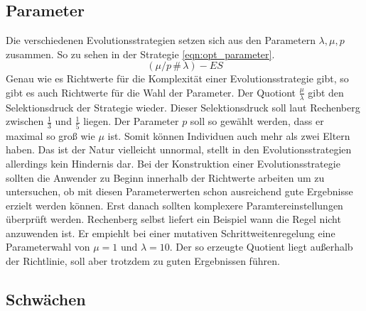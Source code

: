 \subsection{Parameter}
Die verschiedenen Evolutionsstrategien setzen sich aus den Parametern $\lambda, \mu, p$ zusammen. So zu sehen in der Strategie \ref{eqn:opt_parameter}.
\begin{equation}
\label{eqn:opt_parameter}
(\mu/p\,\#\,\lambda)-ES
\end{equation}
Genau wie es Richtwerte für die Komplexität einer Evolutionsstrategie gibt, so gibt es auch Richtwerte für die Wahl der Parameter.
Der Quotiont $\frac{\mu}{\lambda}$ gibt den Selektionsdruck der Strategie wieder. Dieser Selektionsdruck soll laut Rechenberg zwischen $\frac{1}{3}$ und $\frac{1}{5}$ liegen.
Der Parameter $p$ soll so gewählt werden, dass er maximal so groß wie $\mu$ ist. Somit können Individuen auch mehr als zwei Eltern haben. Das ist der Natur vielleicht unnormal, stellt in den Evolutionsstrategien allerdings kein Hindernis dar.
Bei der Konstruktion einer Evolutionsstrategie sollten die Anwender zu Beginn innerhalb der Richtwerte arbeiten um zu untersuchen, ob mit diesen Parameterwerten schon ausreichend gute Ergebnisse erzielt werden können. Erst danach sollten komplexere Paramtereinstellungen überprüft werden.
Rechenberg selbst liefert ein Beispiel wann die Regel nicht anzuwenden ist. Er empiehlt bei einer mutativen Schrittweitenregelung eine Parameterwahl von $\mu=1$ und $\lambda=10$. Der so erzeugte Quotient liegt außerhalb der Richtlinie, soll aber trotzdem zu guten Ergebnissen führen.

\subsection{Schwächen}


